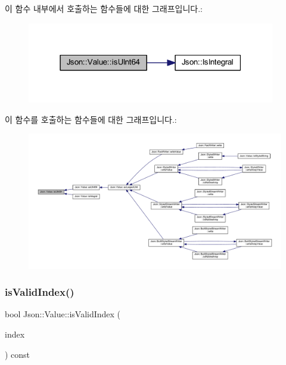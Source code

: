 이 함수 내부에서 호출하는 함수들에 대한 그래프입니다.\+:\nopagebreak
\begin{figure}[H]
\begin{center}
\leavevmode
\includegraphics[width=307pt]{class_json_1_1_value_a883576e35cb03a785258edb56777a2de_cgraph}
\end{center}
\end{figure}
이 함수를 호출하는 함수들에 대한 그래프입니다.\+:\nopagebreak
\begin{figure}[H]
\begin{center}
\leavevmode
\includegraphics[width=350pt]{class_json_1_1_value_a883576e35cb03a785258edb56777a2de_icgraph}
\end{center}
\end{figure}
\mbox{\label{class_json_1_1_value_ac2928f174a6e081c1500c28c2d61ee93}} 
\subsubsection{\texorpdfstring{is\+Valid\+Index()}{isValidIndex()}}
{\footnotesize\ttfamily bool Json\+::\+Value\+::is\+Valid\+Index (\begin{DoxyParamCaption}\item[{\hyperlink{class_json_1_1_value_a184a91566cccca7b819240f0d5561c7d}{Array\+Index}}]{index }\end{DoxyParamCaption}) const}



